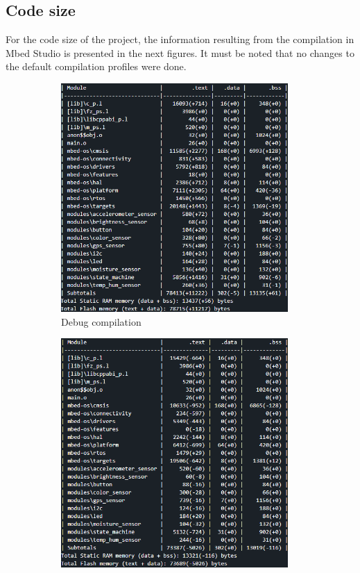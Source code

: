 \clearpage
\subsection{Code size}
For the code size of the project, the information resulting from the compilation in Mbed Studio is presented in the next figures. It must be noted that no changes to the default compilation profiles were done.
\begin{figure}[H]
    \centering
    \begin{subfigure}[t]{0.45\textwidth}
        \centering
        \includegraphics[width=0.95\textwidth]{images/4/Debug.png}
        \caption{Debug compilation}
    \end{subfigure}
    \begin{subfigure}[t]{0.45\textwidth}
        \centering
        \includegraphics[width=0.95\textwidth]{images/4/Develop.png}

\end{subfigure}
\end{figure}
